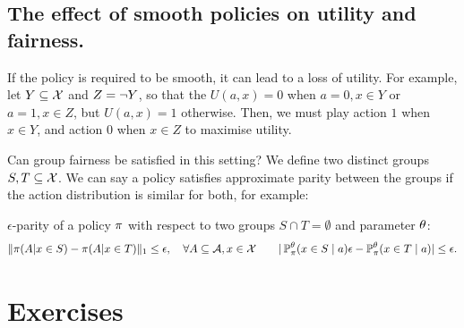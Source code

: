 \subsection{The effect of smooth policies on utility and fairness.}
\begin{frame}
If the policy is required to be smooth, it can lead to a loss of utility. For example, let $Y \subseteq {\mathcal{X}}$ and $Z = \neg Y$, so that the $U(a,x) = 0$ when $a=0, x\in Y$ or $a=1, x \in Z$, but $U(a,x)=1$ otherwise. Then, we must play action $1$ when $x \in Y$, and action $0$ when $x \in Z$ to maximise utility. 
  
  Can group fairness be satisfied in this setting?   We define two distinct groups  $S, T \subseteq {\mathcal{X}}$. We can say a policy satisfies approximate parity between the groups if the action distribution is similar for both, for example:
  \begin{definition}{$\epsilon$-parity} of a policy $\pi$ with respect to two groups $S \cap T = \emptyset$ and parameter $\theta$:
    \[
      \|\pi(A | x \in S) - \pi(A | x \in T)\|_1 \leq \epsilon, \quad \forall A \subseteq {\mathcal{A}}, x \in {\mathcal{X}}
      \qquad 
      |\mathop{\mbox{\ensuremath{\mathbb{P}}}}\nolimits_\pi^\theta(x \in S \mid a)\epsilon - \mathop{\mbox{\ensuremath{\mathbb{P}}}}\nolimits_\pi^\theta(x \in T \mid a)| \leq \epsilon.
    \]
    \label{def:epsilon-parity}
  \end{definition}

\end{frame}


\section{Exercises}

